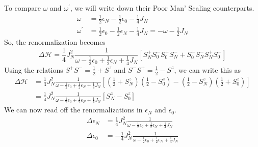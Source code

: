 \documentclass[twoside]{report}
\numberwithin{equation}{section}
\begin{document}
To compare \(\omega\) and \(\omega^\prime\), we will write down their Poor Man' Scaling counterparts.
\begin{equation}\begin{aligned}
	\omega &= \frac{1}{2}\epsilon_N - \frac{1}{2}\epsilon_0 - \frac{1}{4}J_N\\
	\omega^\prime &= \frac{1}{2}\epsilon_0 - \frac{1}{2}\epsilon_N - \frac{1}{4}J_N = -\omega - \frac{1}{2}J_N
\end{aligned}\end{equation}
So, the renormalization becomes
\begin{equation}
	\Delta \mathcal{H} = \frac{1}{4}J_N^2 \frac{1}{\omega - \frac{1}{2}\epsilon_0 + \frac{1}{2}\epsilon_N + \frac{1}{4}J_N}\left[S_N^+S_0^- S_0^+ S_N^- + S_0^+ S_N^- S_N^+S_0^-\right]
\end{equation}
Using the relations \(S^+ S^- = \frac{1}{2} + S^z\) and \(S^- S^+ = \frac{1}{2} - S^z\), we can write this as
\begin{equation}\begin{aligned}
	\Delta \mathcal{H} &= \frac{1}{4}J_N^2 \frac{1}{\omega - \frac{1}{2}\epsilon_0 + \frac{1}{2}\epsilon_N + \frac{1}{4}J_N}\left[\left(\frac{1}{2} + S_N^z\right)\left(\frac{1}{2} - S_0^z\right) - \left(\frac{1}{2} - S_N^z\right)\left(\frac{1}{2} + S_0^z\right)\right]\\
		    &= \frac{1}{4}J_N^2 \frac{1}{\omega - \frac{1}{2}\epsilon_0 + \frac{1}{2}\epsilon_N + \frac{1}{4}J_N}\left[S_N^z - S_0^z\right]
\end{aligned}\end{equation}
We can now read off the renormalizations in \(\epsilon_N\) and \(\epsilon_0\).
\begin{equation}\begin{aligned}
	\Delta \epsilon_N &= \frac{1}{4}J_N^2 \frac{1}{\omega - \frac{1}{2}\epsilon_0 + \frac{1}{2}\epsilon_N + \frac{1}{4}J_N}\\
	\Delta \epsilon_0 &= -\frac{1}{4}J_N^2 \frac{1}{\omega - \frac{1}{2}\epsilon_0 + \frac{1}{2}\epsilon_N + \frac{1}{4}J_N}
\end{aligned}\end{equation}
\end{document}
